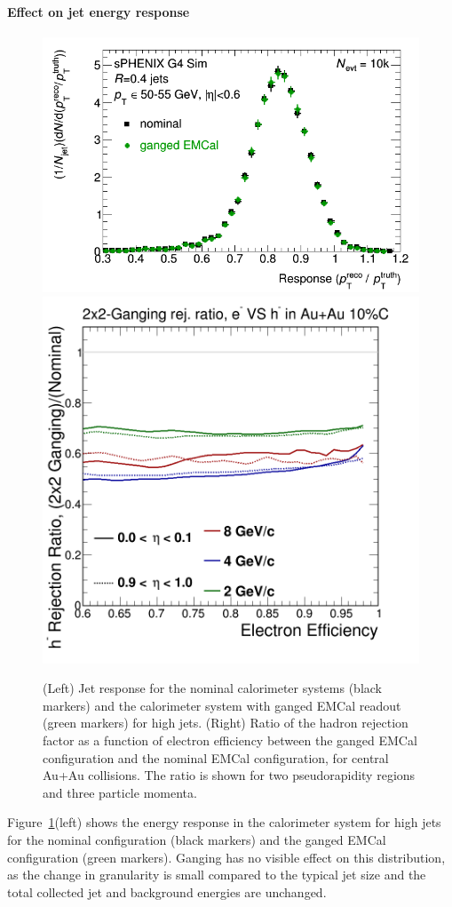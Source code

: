 \paragraph{Effect on jet energy response}
\begin{figure}[hbt]
  \centering
  \includegraphics[width=0.4\linewidth]{figs/jetresponse_ganged_ecal}
  \hspace{0.1\linewidth}
  \includegraphics[width=0.4\linewidth]{figs/hadron_rejection_ganged_over_nominal}
  \caption{(Left)
  Jet response for the nominal calorimeter systems (black markers) and the calorimeter system with ganged EMCal readout 
(green markers) for high \pt jets.
   (Right)
  Ratio of the hadron rejection factor as a function of electron efficiency between the ganged EMCal configuration 
and the nominal EMCal configuration, for central Au+Au collisions. The ratio is shown for two pseudorapidity regions 
and three particle momenta. }
  \label{fig:jet_containment_ganged}
\end{figure}
Figure~\ref{fig:jet_containment_ganged}(left) shows the energy response in the calorimeter system for high \pt jets for the 
nominal configuration (black markers) and the ganged EMCal configuration (green markers). Ganging has no visible effect
on this distribution, as the change in granularity is small compared to the typical jet size and the total collected
jet and background energies are unchanged.

